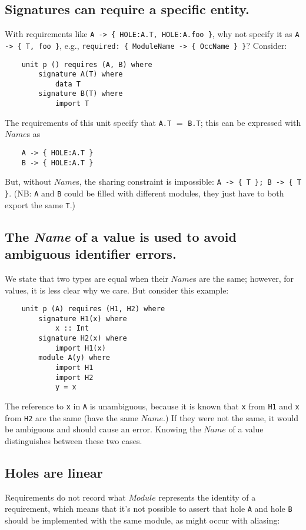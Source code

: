 \documentclass{article}
\newcommand{\I}[1]{\ensuremath{\mathit{#1}}}
\begin{document}
\subsection{Signatures can require a specific entity.}
With requirements like \verb|A -> { HOLE:A.T, HOLE:A.foo }|,
why not specify it as \verb|A -> { T, foo }|,
e.g., \verb|required: { ModuleName -> { OccName } }|?  Consider:

\begin{verbatim}
    unit p () requires (A, B) where
        signature A(T) where
            data T
        signature B(T) where
            import T
\end{verbatim}
The requirements of this unit specify that \verb|A.T| $=$ \verb|B.T|; this
can be expressed with \I{Name}s as

\begin{verbatim}
    A -> { HOLE:A.T }
    B -> { HOLE:A.T }
\end{verbatim}
But, without \I{Name}s, the sharing constraint is impossible:  \verb|A -> { T }; B -> { T }|. (NB: \verb|A| and \verb|B| could be filled with different modules, they just have
to both export the same \verb|T|.)

\subsection{The \textit{Name} of a value is used to avoid
ambiguous identifier errors.}
We state that two types
are equal when their \I{Name}s are the same; however,
for values, it is less clear why we care.  But consider this example:

\begin{verbatim}
    unit p (A) requires (H1, H2) where
        signature H1(x) where
            x :: Int
        signature H2(x) where
            import H1(x)
        module A(y) where
            import H1
            import H2
            y = x
\end{verbatim}
The reference to \verb|x| in \verb|A| is unambiguous, because it is known
that \verb|x| from \verb|H1| and \verb|x| from \verb|H2| are the same (have
the same \I{Name}.)  If they were not the same, it would be ambiguous and
should cause an error.  Knowing the \I{Name} of a value distinguishes
between these two cases.

\subsection{Holes are linear}
Requirements do not record what \I{Module} represents
the identity of a requirement, which means that it's not possible to assert
that hole \verb|A| and hole \verb|B| should be implemented with the same module,
as might occur with aliasing:
\end{document}
